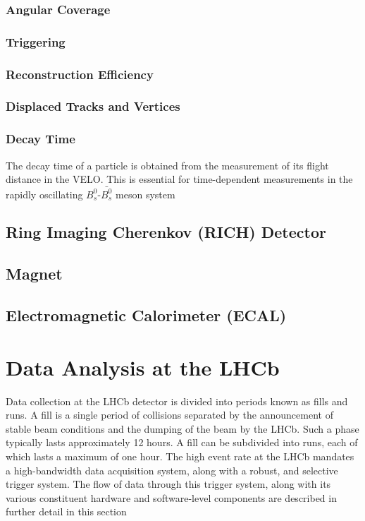 \subsubsection{Angular Coverage}
\subsubsection{Triggering}
\subsubsection{Reconstruction Efficiency}
\subsubsection{Displaced Tracks and Vertices}
\subsubsection{Decay Time}
The decay time of a particle is obtained from the measurement of its flight distance in the VELO. This is essential for time-dependent measurements in the rapidly oscillating
$B_{s}^{0}$-$\bar{B_{s}^{0}}$ meson system
\subsection{Ring Imaging Cherenkov (RICH) Detector}
\subsection{Magnet} 
\subsection{Electromagnetic Calorimeter (ECAL)}
\section{Data Analysis at the LHCb}
Data collection at the LHCb detector is divided into periods known as fills and runs. A fill is a single period of collisions separated by the announcement of stable beam conditions and the dumping of the beam
by the LHCb. Such a phase typically lasts approximately 12 hours. A fill can be subdivided into runs, each of which lasts a maximum of one hour. The high event rate at the LHCb mandates a high-bandwidth data acquisition
system, along with a robust, and selective trigger system. The flow of data through this trigger system, along with its various constituent hardware and software-level components are described in further detail in this section
